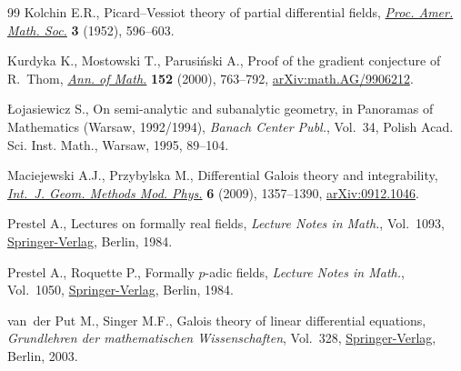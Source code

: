 \documentclass[10pt,a4paper]{amsart}
\numberwithin{equation}{section}
\begin{document}
\begin{thebibliography}{99}
Kolchin E.R., Picard--{V}essiot theory of partial differential fields,
 \href{https://doi.org/10.2307/2032594}{\textit{Proc. Amer. Math. Soc.}} \textbf{3} (1952), 596--603.

Kurdyka K., Mostowski T., Parusi\'nski A., Proof of the gradient conjecture of
 {R}.~{T}hom, \href{https://doi.org/10.2307/2661354}{\textit{Ann. of Math.}} \textbf{152} (2000), 763--792,
 \href{https://arxiv.org/abs/math.AG/9906212}{arXiv:math.AG/9906212}.

{\L}ojasiewicz S., On semi-analytic and subanalytic geometry, in Panoramas of
 Mathematics ({W}arsaw, 1992/1994), \textit{Banach Center Publ.}, Vol.~34,
 Polish Acad. Sci. Inst. Math., Warsaw, 1995, 89--104.

Maciejewski A.J., Przybylska M., Differential {G}alois theory and
 integrability, \href{https://doi.org/10.1142/S0219887809004272}{\textit{Int.~J. Geom. Methods Mod. Phys.}} \textbf{6} (2009),
 1357--1390, \href{https://arxiv.org/abs/0912.1046}{arXiv:0912.1046}.

Prestel A., Lectures on formally real fields, \textit{Lecture Notes in Math.},
 Vol.~1093, \href{https://doi.org/10.1007/BFb0101548}{Springer-Verlag}, Berlin, 1984.

Prestel A., Roquette P., Formally {$p$}-adic fields, \textit{Lecture Notes in
 Math.}, Vol.~1050, \href{https://doi.org/10.1007/BFb0071461}{Springer-Verlag}, Berlin, 1984.

van~der Put M., Singer M.F., Galois theory of linear differential equations,
 \textit{Grundlehren der mathematischen Wissenschaften}, Vol.~328,
 \href{https://doi.org/10.1007/978-3-642-55750-7}{Springer-Verlag}, Berlin, 2003.

\end{thebibliography}
\end{document}
